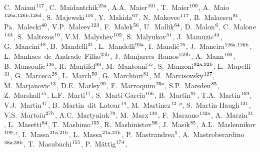 \begin{flushleft}
C.~Maiani$^\textrm{\scriptsize 117}$,
C.~Maidantchik$^\textrm{\scriptsize 25a}$,
A.A.~Maier$^\textrm{\scriptsize 101}$,
T.~Maier$^\textrm{\scriptsize 100}$,
A.~Maio$^\textrm{\scriptsize 126a,126b,126d}$,
S.~Majewski$^\textrm{\scriptsize 116}$,
Y.~Makida$^\textrm{\scriptsize 67}$,
N.~Makovec$^\textrm{\scriptsize 117}$,
B.~Malaescu$^\textrm{\scriptsize 81}$,
Pa.~Malecki$^\textrm{\scriptsize 40}$,
V.P.~Maleev$^\textrm{\scriptsize 123}$,
F.~Malek$^\textrm{\scriptsize 56}$,
U.~Mallik$^\textrm{\scriptsize 64}$,
D.~Malon$^\textrm{\scriptsize 6}$,
C.~Malone$^\textrm{\scriptsize 143}$,
S.~Maltezos$^\textrm{\scriptsize 10}$,
V.M.~Malyshev$^\textrm{\scriptsize 109}$,
S.~Malyukov$^\textrm{\scriptsize 31}$,
J.~Mamuzic$^\textrm{\scriptsize 43}$,
G.~Mancini$^\textrm{\scriptsize 48}$,
B.~Mandelli$^\textrm{\scriptsize 31}$,
L.~Mandelli$^\textrm{\scriptsize 92a}$,
I.~Mandi\'{c}$^\textrm{\scriptsize 76}$,
J.~Maneira$^\textrm{\scriptsize 126a,126b}$,
L.~Manhaes~de~Andrade~Filho$^\textrm{\scriptsize 25b}$,
J.~Manjarres~Ramos$^\textrm{\scriptsize 159b}$,
A.~Mann$^\textrm{\scriptsize 100}$,
B.~Mansoulie$^\textrm{\scriptsize 136}$,
R.~Mantifel$^\textrm{\scriptsize 88}$,
M.~Mantoani$^\textrm{\scriptsize 55}$,
S.~Manzoni$^\textrm{\scriptsize 92a,92b}$,
L.~Mapelli$^\textrm{\scriptsize 31}$,
G.~Marceca$^\textrm{\scriptsize 28}$,
L.~March$^\textrm{\scriptsize 50}$,
G.~Marchiori$^\textrm{\scriptsize 81}$,
M.~Marcisovsky$^\textrm{\scriptsize 127}$,
M.~Marjanovic$^\textrm{\scriptsize 13}$,
D.E.~Marley$^\textrm{\scriptsize 90}$,
F.~Marroquim$^\textrm{\scriptsize 25a}$,
S.P.~Marsden$^\textrm{\scriptsize 85}$,
Z.~Marshall$^\textrm{\scriptsize 15}$,
L.F.~Marti$^\textrm{\scriptsize 17}$,
S.~Marti-Garcia$^\textrm{\scriptsize 166}$,
B.~Martin$^\textrm{\scriptsize 91}$,
T.A.~Martin$^\textrm{\scriptsize 169}$,
V.J.~Martin$^\textrm{\scriptsize 47}$,
B.~Martin~dit~Latour$^\textrm{\scriptsize 14}$,
M.~Martinez$^\textrm{\scriptsize 12}$$^{,p}$,
S.~Martin-Haugh$^\textrm{\scriptsize 131}$,
V.S.~Martoiu$^\textrm{\scriptsize 27b}$,
A.C.~Martyniuk$^\textrm{\scriptsize 79}$,
M.~Marx$^\textrm{\scriptsize 138}$,
F.~Marzano$^\textrm{\scriptsize 132a}$,
A.~Marzin$^\textrm{\scriptsize 31}$,
L.~Masetti$^\textrm{\scriptsize 84}$,
T.~Mashimo$^\textrm{\scriptsize 155}$,
R.~Mashinistov$^\textrm{\scriptsize 96}$,
J.~Masik$^\textrm{\scriptsize 85}$,
A.L.~Maslennikov$^\textrm{\scriptsize 109}$$^{,c}$,
I.~Massa$^\textrm{\scriptsize 21a,21b}$,
L.~Massa$^\textrm{\scriptsize 21a,21b}$,
P.~Mastrandrea$^\textrm{\scriptsize 5}$,
A.~Mastroberardino$^\textrm{\scriptsize 38a,38b}$,
T.~Masubuchi$^\textrm{\scriptsize 155}$,
P.~M\"attig$^\textrm{\scriptsize 174}$,

\end{flushleft}
